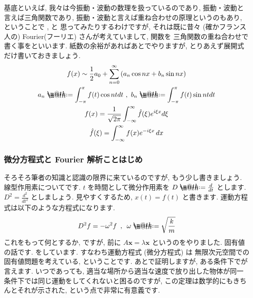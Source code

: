 \documentclass[openany, a4paper, oneside]{book}
\makeatletter
\newcommand*{\defeq}{\mathrel{\rlap{%
\raisebox{0.3ex}{$\m@th\cdot$}}%
\raisebox{-0.3ex}{$\m@th\cdot$}}%
=}
\theoremstyle{break}
\theoremstyle{breakdefn}
\makeatother
\begin{document}
基底といえば, 我々は今振動・波動の数理を扱っているのであり, 振動・波動と言えば三角関数であり,
振動・波動と言えば重ね合わせの原理というのもあり, ということで
, と
思ってみたりするわけですが, それは既に昔々 (確かフランス人の) Fourier(フーリエ) さんが考えていまして, 関数を
三角関数の重ね合わせで書く事をといいます.
紙数の余裕があればあとでやりますが, とりあえず展開式だけ書いておきましょう.
\begin{gather}
f (x)
\sim
\frac{1}{2}a_0 + \sum_{n=0}^{\infty} \left ( a_n \cos nx + b_n \sin nx  \right) \\
a_n \defeq \int_{-\pi}^{\pi}f (t)\cos ntdt \,\, , \,\,
b_n \defeq \int_{-\pi}^{\pi}f (t)\sin ntdt \\
f (x)
=
\frac{1}{ \sqrt{ 2 \pi } } \int_{-\infty}^{\infty}  \hat{f}( \xi ) e^{i\xi x}d\xi \\
\hat{f}(\xi)
=
\int_{-\infty}^{\infty} f (x) e^{-i \xi x} \, dx
\end{gather}
\subsubsection{微分方程式と Fourier 解析ことはじめ}
\label{sec-4-3-2-10-6}

そろそろ筆者の知識と認識の限界に来ているのですが, もう少し書きましょう.
線型作用素についてです.  $t$ を時間として微分作用素を $D\defeq\frac{d}{dt}$ とします.
 $D^2=\frac{d^2}{dt^2}$ としましょう.
見やすくするため,  $x (t) = f (t)$ と書きます. 運動方程式は以下のような方程式になります.
    \begin{align}
        D^2f = -\omega ^{2} f \,\,\, , \,\,\, \omega \defeq \sqrt{\frac{k}{m}}
    \end{align}
これをもって何とするか, ですが, 前に $A\bm{x}=\lambda \bm{x}$ というのをやりました.
固有値の話です. をしています. すなわち運動方程式 (微分方程式) は
無限次元空間での固有値問題を考えている, ということです.
あとで証明しますが, ある条件下でが言えます.
いつであっても, 適当な場所から適当な速度で放り出した物体が同一条件下では同じ運動をしてくれないと困るのですが,
この定理は数学的にもきちんとそれが示された, という点で非常に有意義です.
\end{document}
